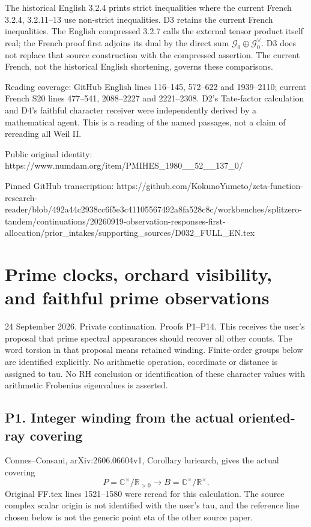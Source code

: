 \documentclass[
  11pt,
]{article}
\begin{document}
The historical English 3.2.4 prints strict inequalities where the
current French 3.2.4, 3.2.11--13 use non-strict inequalities. D3 retains
the current French inequalities. The English compressed 3.2.7 calls the
external tensor product itself real; the French proof first adjoins its
dual by the direct sum \(\mathcal G_0\oplus\mathcal G_0^\vee\). D3 does
not replace that source construction with the compressed assertion. The
current French, not the historical English shortening, governs these
comparisons.

Reading coverage: GitHub English lines 116--145, 572--622 and
1939--2110; current French S20 lines 477--541, 2088--2227 and
2221--2308. D2's Tate-factor calculation and D4's faithful character
receiver were independently derived by a mathematical agent. This is a
reading of the named passages, not a claim of rereading all Weil II.

Public original identity:
https://www.numdam.org/item/PMIHES\_1980\_\_52\_\_137\_0/

Pinned GitHub transcription:
https://github.com/KokunoYumeto/zeta-function-research-reader/blob/492a44c2938cc6f5e3c41105567492a8fa528c8c/workbenches/splitzero-tandem/continuations/20260919-observation-responses-first-allocation/prior\_intakes/supporting\_sources/D032\_FULL\_EN.tex

\section{Prime clocks, orchard visibility, and faithful prime
observations}\label{prime-clocks-orchard-visibility-and-faithful-prime-observations}

24 September 2026. Private continuation. Proofs P1--P14. This receives
the user's proposal that prime spectral appearances should recover all
other counts. The word torsion in that proposal means retained winding.
Finite-order groups below are identified explicitly. No arithmetic
operation, coordinate or distance is assigned to tau. No RH conclusion
or identification of these character values with arithmetic Frobenius
eigenvalues is asserted.

\subsection{P1. Integer winding from the actual oriented-ray
covering}\label{p1.-integer-winding-from-the-actual-oriented-ray-covering}

Connes--Consani, arXiv:2606.06604v1, Corollary luriearch, gives the
actual covering \[
P=\mathbb C^\times/\mathbb R_{>0}\longrightarrow B=\mathbb C^\times/\mathbb R^\times.
\] Original FF.tex lines 1521--1580 were reread for this calculation.
The source complex scalar origin is not identified with the user's tau,
and the reference line chosen below is not the generic point eta of the
other source paper.
\end{document}
